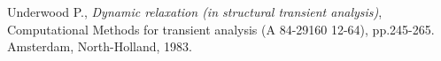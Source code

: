 \begin{thebibliography}{99}
 Underwood P., \textit{Dynamic relaxation (in structural transient analysis)}, Computational Methods for transient analysis (A 84-29160 12-64), pp.245-265. Amsterdam, North-Holland, 1983.

\end{thebibliography}